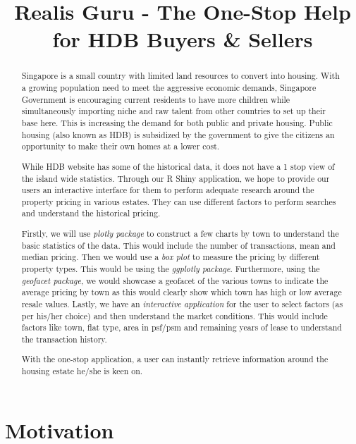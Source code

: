 \documentclass{acm_proc_article-sp}
\title{Realis Guru - The One-Stop Help for HDB Buyers \& Sellers}
\author{
\alignauthor Amrita Mishra \\
        \affaddr{Singapore Management University}\\
       \email{\href{mailto:amritam.2020@mitb.smu.edu.sg}{\nolinkurl{amritam.2020@mitb.smu.edu.sg}}}
\and \alignauthor Sng Kah Leong \\
        \affaddr{Singapore Management University}\\
       \email{\href{mailto:klsng.2020@mitb.smu.edu.sg}{\nolinkurl{klsng.2020@mitb.smu.edu.sg}}}
\and }
\date{}
\begin{document}
\maketitle

\begin{abstract}
Singapore is a small country with limited land resources to convert into
housing. With a growing population need to meet the aggressive economic
demands, Singapore Government is encouraging current residents to have
more children while simultaneously importing niche and raw talent from
other countries to set up their base here. This is increasing the demand
for both public and private housing. Public housing (also known as HDB)
is subsidized by the government to give the citizens an opportunity to
make their own homes at a lower cost.

While HDB website has some of the historical data, it does not have a 1
stop view of the island wide statistics. Through our R Shiny
application, we hope to provide our users an interactive interface for
them to perform adequate research around the property pricing in various
estates. They can use different factors to perform searches and
understand the historical pricing.

Firstly, we will use \emph{plotly package} to construct a few charts by
town to understand the basic statistics of the data. This would include
the number of transactions, mean and median pricing. Then we would use a
\emph{box plot} to measure the pricing by different property types. This
would be using the \emph{ggplotly package}. Furthermore, using the
\emph{geofacet package}, we would showcase a geofacet of the various
towns to indicate the average pricing by town as this would clearly show
which town has high or low average resale values. Lastly, we have an
\emph{interactive application} for the user to select factors (as per
his/her choice) and then understand the market conditions. This would
include factors like town, flat type, area in psf/psm and remaining
years of lease to understand the transaction history.

With the one-stop application, a user can instantly retrieve information
around the housing estate he/she is keen on.
\end{abstract}

\hypertarget{motivation}{%
\section{Motivation}\label{motivation}}
\end{document}
